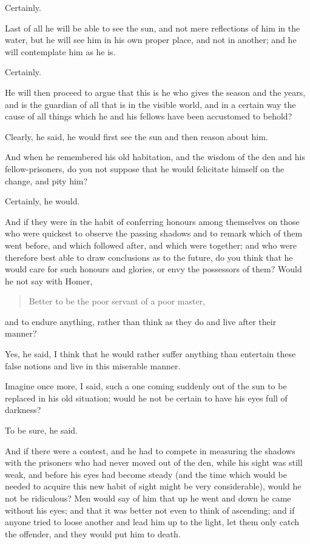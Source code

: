 Certainly.

Last of all he will be able to see the sun, and not mere reflections
of him in the water, but he will see him in his own proper place, and
not in another; and he will contemplate him as he is.

Certainly.

He will then proceed to argue that this is he who gives the season and
the years, and is the guardian of all that is in the visible world,
and in a certain way the cause of all things which he and his fellows
have been accustomed to behold?

Clearly, he said, he would first see the sun and then reason about
him.

And when he remembered his old habitation, and the wisdom of the den
and his fellow-prisoners, do you not suppose that he would felicitate
himself on the change, and pity him?

Certainly, he would.

And if they were in the habit of conferring honours among themselves
on those who were quickest to observe the passing shadows and to
remark which of them went before, and which followed after, and which
were together; and who were therefore best able to draw conclusions as
to the future, do you think that he would care for such honours and
glories, or envy the possessors of them? Would he not say with Homer,

\begin{quote} Better to be the poor servant of a poor master,
\end{quote}

\noindent and to endure anything, rather than think as they do and
live after their manner?

Yes, he said, I think that he would rather suffer anything than
entertain these false notions and live in this miserable manner.

Imagine once more, I said, such a one coming suddenly out of the sun
to be replaced in his old situation; would he not be certain to have
his eyes full of darkness?

To be sure, he said.

And if there were a contest, and he had to compete in measuring the
shadows with the prisoners who had never moved out of the den, while
his sight was still weak, and before his eyes had become steady (and
the time which would be needed to acquire this new habit of sight
might be very considerable), would he not be ridiculous? Men would say
of him that up he went and down he came without his eyes; and that it
was better not even to think of ascending; and if anyone tried to
loose another and lead him up to the light, let them only catch the
offender, and they would put him to death.


